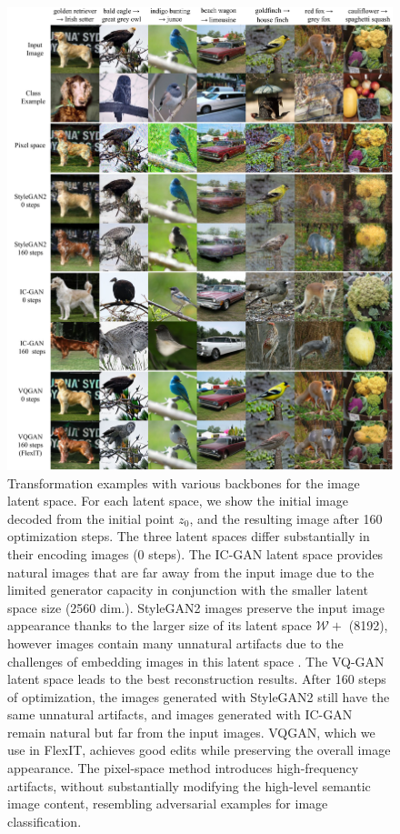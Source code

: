 \begin{figure}[t!]
    \centering
    \includegraphics[width=0.85\linewidth]{images/flexit/assets/encoder2.pdf}
    \caption{
    Transformation examples with various backbones for the image latent space. For each latent space, we show the initial image decoded from the initial point $z_0$, and the resulting image after 160 optimization steps. 
    The three latent spaces differ substantially in their encoding images (0 steps). The IC-GAN latent space provides natural images that are far away from the input image due to the limited generator capacity in conjunction with the smaller latent space size (2560 dim.). StyleGAN2 images preserve the input image appearance thanks to the larger size of its latent space $\mathcal{W+}$ (8192), however images contain many unnatural artifacts due to the challenges of embedding images in this latent space \cite{tov2021designing}. The VQ-GAN latent space leads to the best  reconstruction results.
    After 160 steps of optimization, the images generated with StyleGAN2 still have the same unnatural artifacts, and images generated with IC-GAN remain natural but  far from the input images.
    VQGAN, which we use in FlexIT, achieves good edits while preserving the overall image appearance.
    The pixel-space method introduces high-frequency artifacts, without substantially modifying the high-level semantic image content, resembling adversarial examples for image classification. 
    }
    \label{fig:encoders2}
\end{figure}



